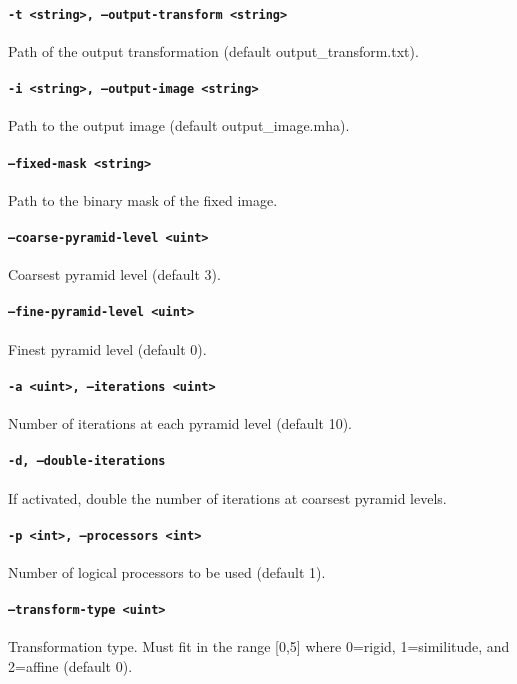 \paragraph{\texttt{-t <string>,  --output-transform <string>}}
Path of the output transformation (default output\_transform.txt).

\paragraph{\texttt{-i <string>,  --output-image <string>}}
Path to the output image (default output\_image.mha).

\paragraph{\texttt{--fixed-mask <string>}}
Path to the binary mask of the fixed image.

\paragraph{\texttt{--coarse-pyramid-level <uint>}}
Coarsest pyramid level (default 3).

\paragraph{\texttt{--fine-pyramid-level <uint>}}
Finest pyramid level (default 0).

\paragraph{\texttt{-a <uint>,  --iterations <uint>}}
Number of iterations at each pyramid level (default 10).

\paragraph{\texttt{-d,  --double-iterations}}
If activated, double the number of iterations at coarsest pyramid
levels.

\paragraph{\texttt{-p <int>,  --processors <int>}}
Number of logical processors to be used (default 1).

\paragraph{\texttt{--transform-type <uint>}}
Transformation type.  Must fit in the range [0,5] where 0=rigid,
1=similitude, and 2=affine (default 0).

